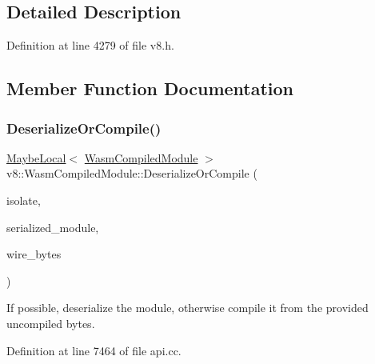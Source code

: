 \subsection{Detailed Description}


Definition at line 4279 of file v8.\+h.



\subsection{Member Function Documentation}
\mbox{\label{classv8_1_1WasmCompiledModule_adafb5819c0867c619c5a9581b590d16a}} 
\subsubsection{\texorpdfstring{Deserialize\+Or\+Compile()}{DeserializeOrCompile()}}
{\footnotesize\ttfamily \mbox{\hyperlink{classv8_1_1MaybeLocal}{Maybe\+Local}}$<$ \mbox{\hyperlink{classv8_1_1WasmCompiledModule}{Wasm\+Compiled\+Module}} $>$ v8\+::\+Wasm\+Compiled\+Module\+::\+Deserialize\+Or\+Compile (\begin{DoxyParamCaption}\item[{Isolate $\ast$}]{isolate,  }\item[{\mbox{\hyperlink{structv8_1_1WasmCompiledModule_1_1BufferReference}{Wasm\+Compiled\+Module\+::\+Buffer\+Reference}}}]{serialized\+\_\+module,  }\item[{\mbox{\hyperlink{structv8_1_1WasmCompiledModule_1_1BufferReference}{Wasm\+Compiled\+Module\+::\+Buffer\+Reference}}}]{wire\+\_\+bytes }\end{DoxyParamCaption})\hspace{0.3cm}{\ttfamily [static]}}

If possible, deserialize the module, otherwise compile it from the provided uncompiled bytes. 

Definition at line 7464 of file api.\+cc.

\mbox{\label{classv8_1_1WasmCompiledModule_a918c7382164ec45c03560538d3e52481}} 
